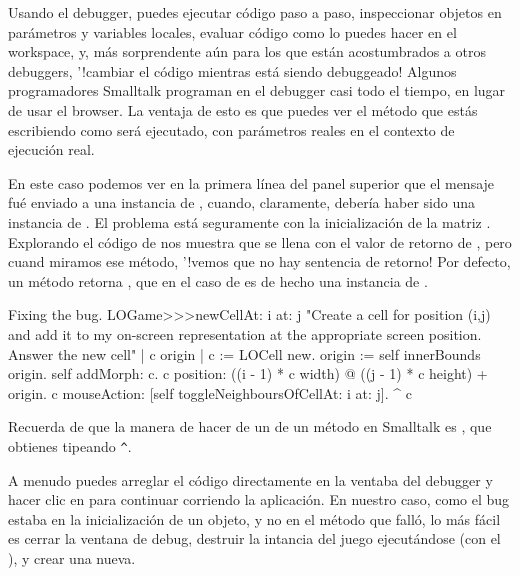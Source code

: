 \documentclass[a4paper,10pt,twoside]{book}
\begin{document}
Usando el debugger, puedes ejecutar c\'odigo paso a paso, inspeccionar objetos en par\'ametros y variables locales, evaluar c\'odigo como lo puedes hacer en el workspace, y, m\'as sorprendente a\'un para los que est\'an acostumbrados a otros debuggers, '!cambiar el c\'odigo mientras est\'a siendo debuggeado! Algunos programadores Smalltalk programan en el debugger casi todo el tiempo, en lugar de usar el browser. La ventaja de esto es que puedes ver el m\'etodo que est\'as escribiendo como ser\'a ejecutado, con par\'ametros reales en el contexto de ejecuci\'on real.

En este caso podemos ver en la primera l\'inea del panel superior que el mensaje  fu\'e enviado a una instancia de , cuando, claramente, deber\'ia haber sido una instancia de .
El problema est\'a seguramente con la inicializaci\'on de la matriz .
Explorando el c\'odigo de  nos muestra que  se llena con el valor de retorno de , pero cuand miramos ese m\'etodo, '!vemos que no hay sentencia de retorno!
Por defecto, un m\'etodo retorna , que en el caso de  es de hecho una instancia de .


\begin{method}{Fixing the bug.}
LOGame>>>newCellAt: i at: j
   "Create a cell for position (i,j) and add it to my on-screen
   representation at the appropriate screen position.  Answer the new cell"
   | c origin |
   c := LOCell new.
   origin := self innerBounds origin.
   self addMorph: c.
   c position: ((i - 1) * c width) @ ((j - 1) * c height) + origin.
   c mouseAction: [self toggleNeighboursOfCellAt: i at: j].
   ^ c
\end{method}

\noindent
Recuerda de  que la manera de hacer  de un  de un m\'etodo en Smalltalk es \ct{^}, que obtienes tipeando \verb|^|.

A menudo puedes arreglar el c\'odigo directamente en la ventaba del debugger y hacer clic en  para continuar corriendo la aplicaci\'on.
En nuestro caso, como el bug estaba en la inicializaci\'on de un objeto, y no en el m\'etodo que fall\'o, lo m\'as f\'acil
es cerrar la ventana de debug, destruir la intancia del juego ejecut\'andose (con el ), y crear una nueva.
\end{document}
